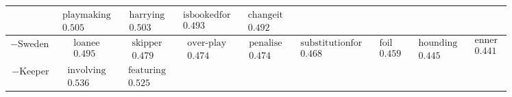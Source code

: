 \documentclass[10pt, a4paper]{UUThesisTemplate}
\begin{document}
\begin{table}
\begin{tabular}{r|c c c c c c c c}
& $ \begin{matrix} \text{playmaking} \\ 0.505 \end{matrix}$
& $ \begin{matrix} \text{harrying} \\ 0.503 \end{matrix}$
& $ \begin{matrix} \text{isbookedfor} \\ 0.493 \end{matrix}$
& $ \begin{matrix} \text{changeit} \\ 0.492 \end{matrix}$
\\\hline
$-$Sweden
& $ \begin{matrix} \text{loanee} \\ 0.495 \end{matrix}$
& $ \begin{matrix} \text{skipper} \\ 0.479 \end{matrix}$
& $ \begin{matrix} \text{over-play} \\ 0.474 \end{matrix}$
& $ \begin{matrix} \text{penalise} \\ 0.474 \end{matrix}$
& $ \begin{matrix} \text{substitutionfor} \\ 0.468 \end{matrix}$
& $ \begin{matrix} \text{foil} \\ 0.459 \end{matrix}$
& $ \begin{matrix} \text{hounding} \\ 0.445 \end{matrix}$
& $ \begin{matrix} \text{enner} \\ 0.441 \end{matrix}$
\\\hline
$-$Keeper
& $ \begin{matrix} \text{involving} \\ 0.536 \end{matrix}$
& $ \begin{matrix} \text{featuring} \\ 0.525 \end{matrix}$

\end{tabular}
\end{table}
\end{document}
